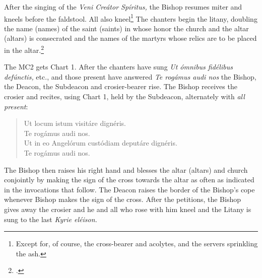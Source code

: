 \documentclass[letterpaper]{report}
\begin{document}
{    \rubric After the singing of the \textit{Veni Cre\'ator Sp\'iritus,} the
    Bishop resumes miter and kneels before the faldstool. All also
    kneel\footnote{Except for, of course, the cross-bearer and acolytes, and
    the servers sprinkling the ash.} The chanters begin the litany, doubling
    the name (names) of the saint (saints) in whose honor the church and the
    altar (altars) is consecrated and the names of the martyrs whose relics are
    to be placed in the altar.\footcite[If the name of any of these saints is
    inscried in the litany, e.g., St. Peter, St. Stephen, it is invoked a
    second time immediately after the proper invocation in the Litany. If the
    name is not in the Litany, it is inserted after the \textit{individual}
    invocations of the saints of the same category, but before the general
    invocation, e.g., if the church is consecrated in honor of St. Francis de
    Sales, his name is inserted twice after \textit{Sancte Nicol\ae} and before
    \textit{Omnes sancti Pontifices et Confessores.} If the church or altar is
    consecrated in honor of the Blessed Virgin under any title whatever the
    invocation \textit{Sancta Maria} is mentioned twice; if in honor of a
    mystery of the Life and Passion of Our Lord, the petition \textit{Fili
    Redemptor mundi Deus} is repeated.][Note, p. 51.]{consecranda}

    \rubric The MC2 gets Chart 1. After the chanters have sung \textit{Ut
    \'omnibus fid\'elibus def\'unctis,} etc., and those present have answered
    \textit{Te rog\'amus audi nos} the Bishop, the Deacon, the Subdeacon and
    crosier-bearer rise. The Bishop receives the crosier and recites, using
    Chart 1, held by the Subdeacon, alternately with \textit{all present}:

    \begin{quote}
        \vbar Ut locum istum visitáre dignéris.\\
        \rbar Te rogámus audi nos.\\
        \vbar Ut in eo Angelórum custódiam deputáre dignéris.\\
        \rbar Te rogámus audi nos.\\
    \end{quote}

    The Bishop then raises his right hand and blesses the altar (altars) and
    church conjointly by making the sign of the cross towards the altar as
    often as indicated in the invocations that follow. The Deacon raises the
    border of the Bishop's cope whenever Bishop makes the sign of the cross.
    After the petitions, the Bishop gives away the crosier and he and all who
    rose with him kneel and the Litany is sung to the last \textit{Kyrie
    el\'eison.}

}
\end{document}
